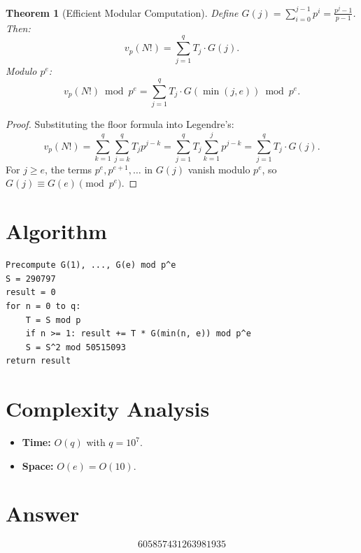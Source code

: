 \documentclass[12pt]{article}
\newtheorem{theorem}{Theorem}
\begin{document}
\begin{theorem}[Efficient Modular Computation]
Define $G(j) = \sum_{i=0}^{j-1} p^i = \frac{p^j - 1}{p-1}$. Then:
\[
v_p(N!) = \sum_{j=1}^{q} T_j \cdot G(j).
\]
Modulo $p^e$:
\[
v_p(N!) \bmod p^e = \sum_{j=1}^{q} T_j \cdot G(\min(j,e)) \bmod p^e.
\]
\end{theorem}

\begin{proof}
Substituting the floor formula into Legendre's:
\[
v_p(N!) = \sum_{k=1}^{q} \sum_{j=k}^{q} T_j p^{j-k} = \sum_{j=1}^{q} T_j \sum_{k=1}^{j} p^{j-k} = \sum_{j=1}^{q} T_j \cdot G(j).
\]
For $j \ge e$, the terms $p^e, p^{e+1}, \ldots$ in $G(j)$ vanish modulo $p^e$, so $G(j) \equiv G(e) \pmod{p^e}$.
\end{proof}

\section{Algorithm}

\begin{verbatim}
Precompute G(1), ..., G(e) mod p^e
S = 290797
result = 0
for n = 0 to q:
    T = S mod p
    if n >= 1: result += T * G(min(n, e)) mod p^e
    S = S^2 mod 50515093
return result
\end{verbatim}

\section{Complexity Analysis}

\begin{itemize}
\item \textbf{Time:} $O(q)$ with $q = 10^7$.
\item \textbf{Space:} $O(e) = O(10)$.
\end{itemize}

\section{Answer}

\[
\boxed{605857431263981935}
\]
\end{document}
